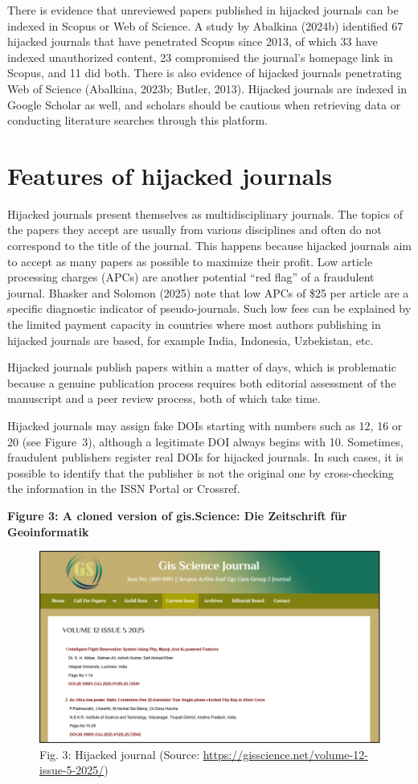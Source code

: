 \documentclass[a4paper,
fontsize=11pt,
oneside,
numbers=noperiodatend,
parskip=half-,
bibliography=totoc,
final
]{scrartcl}
\begin{document}
There is evidence that unreviewed papers published in hijacked journals
can be indexed in Scopus or Web of Science. A study by Abalkina (2024b)
identified 67 hijacked journals that have penetrated Scopus since 2013,
of which 33 have indexed unauthorized content, 23 compromised the
journal's homepage link in Scopus, and 11 did both. There is also
evidence of hijacked journals penetrating Web of Science (Abalkina,
2023b; Butler, 2013). Hijacked journals are indexed in Google Scholar as
well, and scholars should be cautious when retrieving data or conducting
literature searches through this platform.

\section{Features of hijacked
journals}\label{features-of-hijacked-journals}

Hijacked journals present themselves as multidisciplinary journals. The
topics of the papers they accept are usually from various disciplines
and often do not correspond to the title of the journal. This happens
because hijacked journals aim to accept as many papers as possible to
maximize their profit. Low article processing charges (APCs) are another
potential \enquote{red flag} of a fraudulent journal. Bhasker and
Solomon (2025) note that low APCs of \$25 per article are a specific
diagnostic indicator of pseudo-journals. Such low fees can be explained
by the limited payment capacity in countries where most authors
publishing in hijacked journals are based, for example India, Indonesia,
Uzbekistan, etc.

Hijacked journals publish papers within a matter of days, which is
problematic because a genuine publication process requires both
editorial assessment of the manuscript and a peer review process, both
of which take time.

Hijacked journals may assign fake DOIs starting with numbers such as 12,
16 or 20 (see Figure~3), although a legitimate DOI always begins with
10. Sometimes, fraudulent publishers register real DOIs for hijacked
journals. In such cases, it is possible to identify that the publisher
is not the original one by cross-checking the information in the ISSN
Portal or Crossref.

\textbf{Figure 3: A cloned version of gis.Science: Die Zeitschrift für
Geoinformatik}

\begin{figure}[H]
\centering
\includegraphics[width=.7\textwidth]{img/fig3.png}
\caption{Fig. 3: Hijacked journal (Source: \url{https://gisscience.net/volume-12-issue-5-2025/})}
\end{figure}
\end{document}
